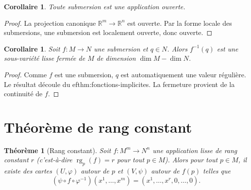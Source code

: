 \documentclass[12pt,a4paper,openany]{book}
\theoremstyle{definition}
\theoremstyle{plain}
\newtheorem{theoreme}[definition]{Théorème}
\newtheorem{corollaire}[definition]{Corollaire}
\theoremstyle{remark}
\newcommand{\R}{\mathbb{R}}
\DeclareMathOperator{\rg}{rg}
\begin{document}
\begin{corollaire}\label{cor:submersion-ouverte}
Toute submersion est une application ouverte.
\end{corollaire}

\begin{proof}
La projection canonique $\R^m \to \R^n$ est ouverte. Par la forme locale des
submersions, une submersion est localement ouverte, donc ouverte.
\end{proof}

\begin{corollaire}\label{cor:submersion-fibre}
Soit $f \colon M \to N$ une submersion et $q \in N$. Alors $f^{-1}(q)$ est une
sous-variété lisse fermée de $M$ de dimension $\dim M - \dim N$.
\end{corollaire}

\begin{proof}
Comme $f$ est une submersion, $q$ est automatiquement une valeur régulière. Le
résultat découle du 
ef{thm:fonctions-implicites}. La fermeture provient de
la continuité de $f$.
\end{proof}


\section{Théorème de rang constant}
\label{sec:rang-constant}

\begin{theoreme}[Rang constant]\label{thm:rang-constant}
Soit $f \colon M^m \to N^n$ une application lisse de rang constant $r$ (c'est-à-dire
$\rg_p(f) = r$ pour tout $p \in M$). Alors pour tout $p \in M$, il existe des
cartes $(U, \varphi)$ autour de $p$ et $(V, \psi)$ autour de $f(p)$ telles que
\[
    (\psi \circ f \circ \varphi^{-1})(x^1, \ldots, x^m)
    = (x^1, \ldots, x^r, 0, \ldots, 0).
\]
\end{theoreme}
\end{document}
